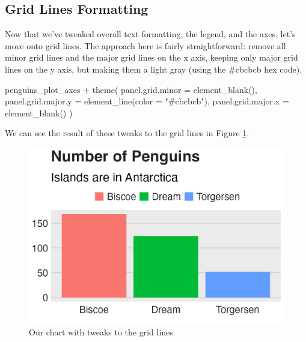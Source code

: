 \documentclass[
]{book}
\newenvironment{Shaded}{\begin{snugshade}}{\end{snugshade}}
\newcommand{\AttributeTok}[1]{\textcolor[rgb]{0.77,0.63,0.00}{#1}}
\newcommand{\FunctionTok}[1]{\textcolor[rgb]{0.00,0.00,0.00}{#1}}
\newcommand{\NormalTok}[1]{#1}
\newcommand{\SpecialCharTok}[1]{\textcolor[rgb]{0.00,0.00,0.00}{#1}}
\newcommand{\StringTok}[1]{\textcolor[rgb]{0.31,0.60,0.02}{#1}}
\begin{document}
\hypertarget{grid-lines-formatting}{%
\subsection*{Grid Lines Formatting}\label{grid-lines-formatting}}

Now that we've tweaked overall text formatting, the legend, and the axes, let's move onto grid lines. The approach here is fairly straightforward: remove all minor grid lines and the major grid lines on the x axis, keeping only major grid lines on the y axis, but making them a light gray (using the \#cbcbcb hex code).

\begin{Shaded}
\begin{Highlighting}[]
\NormalTok{penguins\_plot\_axes }\SpecialCharTok{+}
  \FunctionTok{theme}\NormalTok{(}
    \AttributeTok{panel.grid.minor =} \FunctionTok{element\_blank}\NormalTok{(),}
    \AttributeTok{panel.grid.major.y =} \FunctionTok{element\_line}\NormalTok{(}\AttributeTok{color =} \StringTok{"\#cbcbcb"}\NormalTok{),}
    \AttributeTok{panel.grid.major.x =} \FunctionTok{element\_blank}\NormalTok{()}
\NormalTok{  )}
\end{Highlighting}
\end{Shaded}

We can see the result of these tweaks to the grid lines in Figure \ref{fig:penguins-plot-gridlines-plot}.

\begin{figure}
\includegraphics[width=1\linewidth]{custom-theme_files/figure-latex/penguins-plot-gridlines-plot-1} \caption{Our chart with tweaks to the grid lines}\label{fig:penguins-plot-gridlines-plot}
\end{figure}
\end{document}
